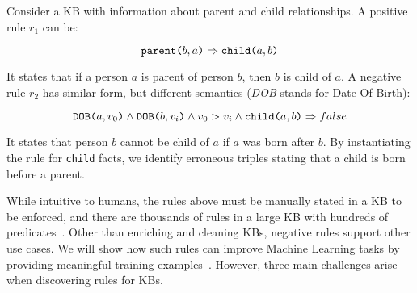 \begin{example}\label{ex:krd_intro}
	Consider a KB with information about parent and child relationships.
	A positive rule $r_1$ can be:
	
	\vspace{-2.5ex}
	{\small
		\begin{equation*}
			\texttt{parent(}b,a\texttt{)} \Rightarrow \texttt{child(}a,b\texttt{)}
		\end{equation*}
	} 
	\vspace{-4ex}
	
	\noindent
	It states that if a person $a$ is parent of person $b$, then $b$ is child of $a$. 
	A negative rule $r_2$ has similar form, but different semantics ({\em DOB} stands for Date Of Birth):
	
	\vspace{-3ex}
	{\small
		\begin{equation*}
			\texttt{DOB(}a,v_0\texttt{)} \wedge \texttt{DOB(}b,v_i\texttt{)} \wedge v_0 > v_i \wedge  \texttt{child(}a,b\texttt{)}  \Rightarrow false
		\end{equation*}
	} 
	\vspace{-4ex}
	
	\noindent It states that person $b$ cannot be child of $a$ if $a$ was born after $b$. By instantiating the rule for \texttt{child} facts, we identify erroneous triples stating that a child is born before a parent.
\end{example}

While intuitive to humans, the rules above must be manually stated in a KB to be enforced, and there are thousands of rules in a large KB with hundreds of predicates~\cite{gc2015big}. Other than enriching and cleaning KBs, negative rules support other use cases. %
We will show how such rules 
can improve Machine Learning tasks by providing meaningful training examples~\cite{richardson2006markov,shin2015incremental}.
%
%
However, %
three main challenges arise when discovering rules for KBs.

